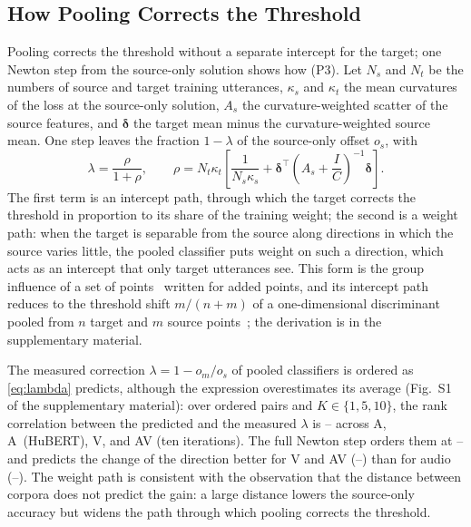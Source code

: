 \subsection{How Pooling Corrects the Threshold}
\label{sec:part1-pooling}

Pooling corrects the threshold without a separate intercept for the target; one Newton step from the source-only solution shows how (P3).
Let $N_s$ and $N_t$ be the numbers of source and target training utterances, $\kappa_s$ and $\kappa_t$ the mean curvatures of the loss at the source-only solution, $A_s$ the curvature-weighted scatter of the source features, and $\boldsymbol{\delta}$ the target mean minus the curvature-weighted source mean.
One step leaves the fraction $1 - \lambda$ of the source-only offset $o_s$, with
\begin{equation}
\label{eq:lambda}
\lambda = \frac{\rho}{1 + \rho},\qquad \rho = N_t\kappa_t\left[\frac{1}{N_s\kappa_s} + \boldsymbol{\delta}^{\top}\left(A_s + \frac{I}{C}\right)^{-1}\boldsymbol{\delta}\right].
\end{equation}
The first term is an intercept path, through which the target corrects the threshold in proportion to its share of the training weight; the second is a weight path: when the target is separable from the source along directions in which the source varies little, the pooled classifier puts weight on such a direction, which acts as an intercept that only target utterances see.
This form is the group influence of a set of points~\cite{koh2019accuracy,pregibon1981logistic} written for added points, and its intercept path reduces to the threshold shift $m/(n+m)$ of a one-dimensional discriminant pooled from $n$ target and $m$ source points~\cite{desilva2023value}; the derivation is in the supplementary material.

The measured correction $\lambda = 1 - o_m/o_s$ of pooled classifiers is ordered as \eqref{eq:lambda} predicts, although the expression overestimates its average (Fig.~S1 of the supplementary material): over ordered pairs and $K \in \{1, 5, 10\}$, the rank correlation between the predicted and the measured $\lambda$ is -- across A, A~(HuBERT), V, and AV (ten iterations).
The full Newton step orders them at -- and predicts the change of the direction better for V and AV (--) than for audio (--).
The weight path is consistent with the observation that the distance between corpora does not predict the gain: a large distance lowers the source-only accuracy but widens the path through which pooling corrects the threshold.

